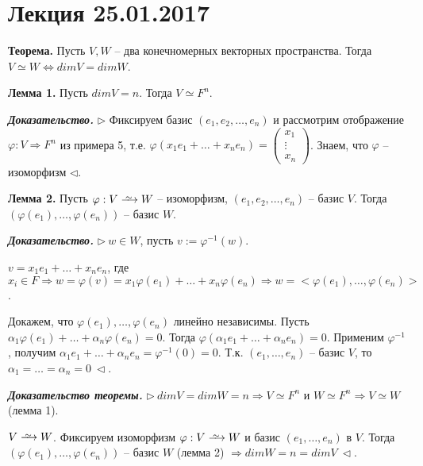 \section{Лекция 25.01.2017}

\textbf{Теорема.} Пусть $V, W$ -- два конечномерных векторных пространства. Тогда $V \simeq W \Leftrightarrow dimV = dimW$.

\vspace{\baselineskip}
\textbf{Лемма 1.} Пусть $dimV = n$. Тогда $V \simeq F^n$.

\vspace{\baselineskip}
\textbf{\textit{Доказательство.}} $\rhd$ Фиксируем базис $(e_1, e_2, \dots, e_n)$ и рассмотрим отображение $\varphi: V \Rightarrow F^n$ из примера 5, т.е. $\varphi (x_1 e_1 + \dots + x_n e_n) = \begin{pmatrix} x_1 \\ \vdots \\ x_n \end{pmatrix}$. Знаем, что $\varphi$ -- изоморфизм $\lhd$.

\vspace{\baselineskip}
\textbf{Лемма 2.} Пусть $\varphi : V \iso W$ -- изоморфизм, $(e_1, e_2, \dots, e_n)$ -- базис $V$. Тогда $(\varphi (e_1), \dots, \varphi (e_n))$ -- базис $W$.

\vspace{\baselineskip}
\textbf{\textit{Доказательство.}} $\rhd \ w \in W$, пусть $v := \varphi^{-1} (w)$.

$v = x_1 e_1 + \dots + x_n e_n$, где $x_i \in F \Rightarrow w = \varphi (v) = x_1 \varphi(e_1) + \dots + x_n \varphi (e_n) \Rightarrow w = <\varphi(e_1), \dots, \varphi(e_n)>$.

Докажем, что $\varphi(e_1), \dots, \varphi(e_n)$ линейно независимы. Пусть $\alpha_1 \varphi(e_1) + \dots + \alpha_n \varphi(e_n) = 0$. Тогда $\varphi (\alpha_1 e_1 + \dots + \alpha_n e_n) = 0$. Применим $\varphi^{-1}$, получим $\alpha_1 e_1 + \dots + \alpha_n e_n = \varphi^{-1}(0) = 0$. Т.к. $(e_1, \dots, e_n)$ -- базис $V$, то $\alpha_1=\dots=\alpha_n = 0 \ \lhd$.

\vspace{\baselineskip}
\textbf{\textit{Доказательство теоремы.}} $\rhd \ dimV = dimW = n \Rightarrow V \simeq F^n$ и $W \simeq F^n \Rightarrow V \simeq W$ (лемма 1).

$V \iso W$. Фиксируем изоморфизм $\varphi : V \iso W$ и базис $(e_1, \dots, e_n)$ в $V$. Тогда $(\varphi(e_1), \dots, \varphi(e_n))$ -- базис $W$ (лемма 2) $\Rightarrow dimW = n = dimV \ \lhd$.

